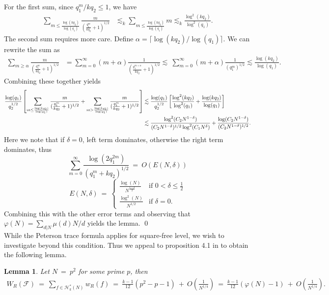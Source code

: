 \documentclass[11pt, reqno]{amsart}
\newtheorem{lemma}[theorem]{Lemma}
\theoremstyle{definition}
\theoremstyle{remark}
\numberwithin{equation}{section}
\begin{document}
For the first sum, since $q_1^{m}/kq_2 \leq 1$, we have
\begin{align*}
    \sum_{m\leq \frac{\log(kq_2)}{\log(q_1)}} \frac{m}{(\frac{q_1^{m}}{kq_2}+1)^{1/2}} &\lesssim_k \sum_{m\leq \frac{\log(kq_2)}{\log(q_1)}} m\lesssim_k \frac{\log^2 (kq_2)}{\log^2 (q_1)}.
\end{align*}
The second sum requires more care. Define $\alpha= \lceil\log(kq_2)/\log(q_1)\rceil$. We can rewrite the sum as
\begin{align}
    \sum_{m \geq\alpha} \frac{m}{(\frac{q_1^{m}}{kq_2}+1)^{1/2}} &=\sum_{m=0}^\infty(m+\alpha)\frac{1}{(\frac{q_1^{m+\alpha}}{kq_2}+1)^{1/2}} \lesssim\ \sum_{m=0}^\infty(m+\alpha)\frac{1}{(q_1^{m})^{1/2}}\lesssim \frac{\log(kq_2)}{\log(q_1)}.
\end{align}
Combining these together yields 
\small\begin{align}
  \frac{\log(q_1)}{q_2^{1/2}}\left[\sum_{m\leq \frac{\log(kq_2)}{\log(q_1)}} \frac{m}{(\frac{q_1^{m}}{kq_2}+1)^{1/2}}+\sum_{m> \frac{\log(kq_2)}{\log(q_1)}} \frac{m}{(\frac{q_1^{m}}{kq_2}+1)^{1/2}} \right] &\lesssim  \frac{\log(q_1)}{q_2^{1/2}}\left[\frac{\log^2( kq_2)}{\log^2 (q_1)}+\frac{\log(kq_2)}{\log(q_1)} \right]\notag \\
  &\lesssim \frac{\log^2(C_2N^{1-\delta})}{(C_2N^{1-\delta})^{1/2}\log^2 (C_1N^{\delta})}+\frac{\log (C_2N^{1-\delta})}{(C_2N^{1-\delta})^{1/2}}.
\end{align}\normalsize
Here we note that if $\delta=0$, left term dominates, otherwise the right term dominates, thus 
$$\sum_{m=0}^{\infty} \frac{\log(2q_1^{2m})}{(q_1^{m}+kq_2)^{1/2}}\ =\ O(E(N,\delta))$$
  \[
    E(N,\delta)\ =\ 
    \begin{cases}
    \frac{\log(N)}{N^{\frac{1-\delta}{2}}} & \text{if } 0< \delta \leq \frac{1}{2} \\[1.5ex]
    \frac{\log^2(N)}{N^{1/2}} & \text{if } \delta = 0.
    \end{cases}
    \]
Combining this with the other error terms and observing that $\varphi(N)=\sum_{d|N}\mu(d)N/d$ yields the lemma. \qed
\\
While the Peterson trace formula applies for square-free level, we wish to investigate beyond this condition.  Thus we appeal to proposition 4.1 in \cite{BarrettEtAl2016arXiv} to obtain the following lemma.
\begin{lemma} \label{lem: sum of weights for N=p2}
    Let $N\ =\ p^2$ for some prime $p$, then
    \begin{align}
        W_R(\mathcal{F}) \ = \ \sum_{f\in\mathcal{H}_k^*(N)}w_R(f) \ = \ \frac{k-1}{12}(p^2-p-1) \ + \ O\left(\frac{1}{N^{1/4}}\right) \ = \ \frac{k-1}{12}(\varphi(N)-1) \ + \ O\left(\frac{1}{N^{1/4}}\right).
    \end{align}
\end{lemma}
\end{document}
